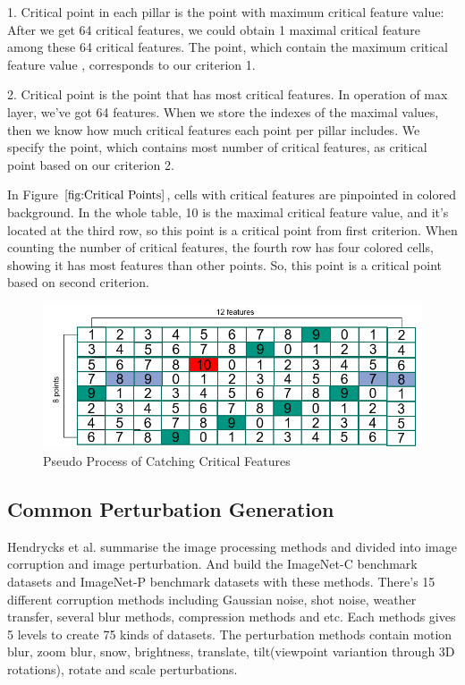 1. Critical point in each pillar is the point with maximum critical feature value: After we get 64 critical features, we could obtain 1 maximal critical feature among these 64 critical features. The point, which contain the maximum critical feature value , corresponds to our criterion 1.

2. Critical point is the point that has most critical features. In operation of max layer, we've got 64 features. When we store the indexes of the maximal values, then we know how much critical features each point per pillar includes. We specify the point, which contains most number of critical features, as critical point based on our criterion 2.

In Figure \(\ref{fig:Critical Points}\), cells with critical features are pinpointed in colored background. In the whole table, 10 is the maximal critical feature value, and it's located at the third row, so this point is a critical point from first criterion. When counting the number of critical features, the fourth row has four colored cells, showing it has most features than other points. So, this point is a critical point based on second criterion.
\begin{figure}[!htbp]
\centering
\includegraphics[scale=0.5]{Graphics/Critical Points.png}
\caption{Pseudo Process of Catching Critical Features}
\label{fig:Critical Points}
\end{figure}

\subsection{Common Perturbation Generation}
Hendrycks et al.\cite{hendrycks_benchmarking_2019} summarise the image processing methods and divided into image corruption and image perturbation. And build the ImageNet-C benchmark datasets and ImageNet-P benchmark datasets with these methods. There's 15 different corruption methods including Gaussian noise, shot noise, weather transfer, several blur methods, compression methods and etc. Each methods gives 5 levels to create 75 kinds of datasets. The perturbation methods contain motion blur, zoom blur, snow, brightness, translate, tilt(viewpoint variantion through 3D rotations), rotate and scale perturbations.

